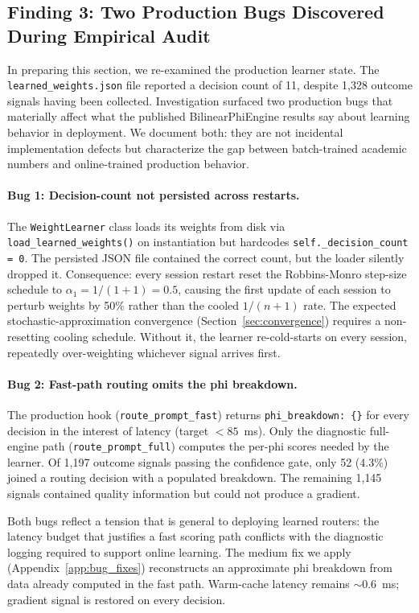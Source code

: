 \subsection{Finding 3: Two Production Bugs Discovered During Empirical Audit}

In preparing this section, we re-examined the production learner state. The \texttt{learned\_weights.json} file reported a decision count of 11, despite 1{,}328 outcome signals having been collected. Investigation surfaced two production bugs that materially affect what the published BilinearPhiEngine results say about learning behavior in deployment. We document both: they are not incidental implementation defects but characterize the gap between batch-trained academic numbers and online-trained production behavior.

\paragraph{Bug 1: Decision-count not persisted across restarts.} The \texttt{WeightLearner} class loads its weights from disk via \texttt{load\_learned\_weights()} on instantiation but hardcodes \texttt{self.\_decision\_count = 0}. The persisted JSON file contained the correct count, but the loader silently dropped it. Consequence: every session restart reset the Robbins-Monro step-size schedule to $\alpha_1 = 1/(1+1) = 0.5$, causing the first update of each session to perturb weights by 50\% rather than the cooled $1/(n+1)$ rate. The expected stochastic-approximation convergence (Section~\ref{sec:convergence}) requires a non-resetting cooling schedule. Without it, the learner re-cold-starts on every session, repeatedly over-weighting whichever signal arrives first.

\paragraph{Bug 2: Fast-path routing omits the phi breakdown.} The production hook (\texttt{route\_prompt\_fast}) returns \texttt{phi\_breakdown: \{\}} for every decision in the interest of latency (target $<85$~ms). Only the diagnostic full-engine path (\texttt{route\_prompt\_full}) computes the per-phi scores needed by the learner. Of 1{,}197 outcome signals passing the confidence gate, only 52 (4.3\%) joined a routing decision with a populated breakdown. The remaining 1{,}145 signals contained quality information but could not produce a gradient.

Both bugs reflect a tension that is general to deploying learned routers: the latency budget that justifies a fast scoring path conflicts with the diagnostic logging required to support online learning. The medium fix we apply (Appendix~\ref{app:bug_fixes}) reconstructs an approximate phi breakdown from data already computed in the fast path. Warm-cache latency remains $\sim$0.6~ms; gradient signal is restored on every decision.

